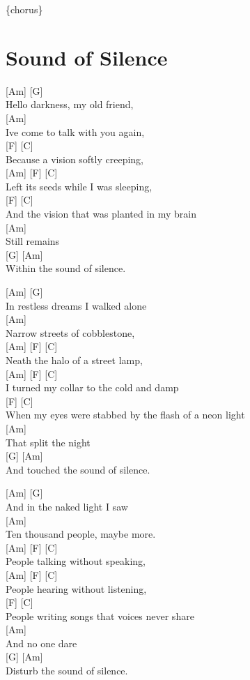 \documentclass[
  letterpaper,
]{scrbook}
\begin{document}
\{chorus\}

\hypertarget{sound-of-silence}{%
\chapter{Sound of Silence}\label{sound-of-silence}}

{[}Am{]} {[}G{]}\\
Hello darkness, my old friend,\\
{[}Am{]}\\
I\textquotesingle ve come to talk with you again,\\
{[}F{]} {[}C{]}\\
Because a vision softly creeping,\\
{[}Am{]} {[}F{]} {[}C{]}\\
Left its seeds while I was sleeping,\\
{[}F{]} {[}C{]}\\
And the vision that was planted in my brain\\
{[}Am{]}\\
Still remains\\
{[}G{]} {[}Am{]}\\
Within the sound of silence.

{[}Am{]} {[}G{]}\\
In restless dreams I walked alone\\
{[}Am{]}\\
Narrow streets of cobblestone,\\
{[}Am{]} {[}F{]} {[}C{]}\\
\textquotesingle Neath the halo of a street lamp,\\
{[}Am{]} {[}F{]} {[}C{]}\\
I turned my collar to the cold and damp\\
{[}F{]} {[}C{]}\\
When my eyes were stabbed by the flash of a neon light\\
{[}Am{]}\\
That split the night\\
{[}G{]} {[}Am{]}\\
And touched the sound of silence.

{[}Am{]} {[}G{]}\\
And in the naked light I saw\\
{[}Am{]}\\
Ten thousand people, maybe more.\\
{[}Am{]} {[}F{]} {[}C{]}\\
People talking without speaking,\\
{[}Am{]} {[}F{]} {[}C{]}\\
People hearing without listening,\\
{[}F{]} {[}C{]}\\
People writing songs that voices never share\\
{[}Am{]}\\
And no one dare\\
{[}G{]} {[}Am{]}\\
Disturb the sound of silence.
\end{document}
